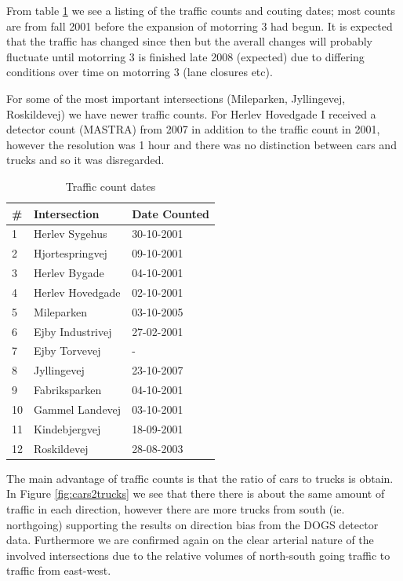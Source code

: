 From table \ref{tab:traffic_counts} we see a listing of the traffic counts and couting dates; most counts are from fall 2001 before the expansion of motorring 3 had begun. It is expected that the traffic has changed since then but the averall changes will probably fluctuate until motorring 3 is finished late 2008 (expected) due to differing conditions over time on motorring 3 (lane closures etc).

For some of the most important intersections (Mileparken, Jyllingevej, Roskildevej) we have newer traffic counts. For Herlev Hovedgade I received a detector count (MASTRA) from 2007 in addition to the traffic count in 2001, however the resolution was 1 hour and there was no distinction between cars and trucks and so it was disregarded.

\begin{table}[!ht]
\begin{center}
\begin{tabular}{l|l|l}
\textbf{\#} & \textbf{Intersection} & \textbf{Date Counted}\\ \hline
1 & Herlev Sygehus & 30-10-2001\\
2 & Hjortespringvej & 09-10-2001\\
3 & Herlev Bygade & 04-10-2001\\
4 & Herlev Hovedgade & 02-10-2001\\
5 & Mileparken & 03-10-2005\\
6 & Ejby Industrivej & 27-02-2001\\
7 & Ejby Torvevej & -\\
8 & Jyllingevej & 23-10-2007\\
9 & Fabriksparken & 04-10-2001\\
10 & Gammel Landevej & 03-10-2001\\
11 & Kindebjergvej & 18-09-2001\\
12 & Roskildevej & 28-08-2003\\
\end{tabular}
\end{center}
\caption{Traffic count dates}
\label{tab:traffic_counts}
\end{table}

The main advantage of traffic counts is that the ratio of cars to trucks is obtain. In Figure \ref{fig:cars2trucks} we see that there there is about the same amount of traffic in each direction, however there are more trucks from south (ie. northgoing) supporting the results on direction bias from the DOGS detector data. Furthermore we are confirmed again on the clear arterial nature of the involved intersections due to the relative volumes of north-south going traffic to traffic from east-west.

